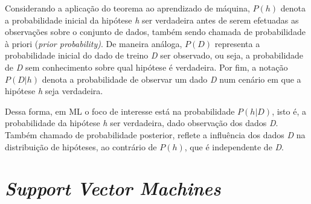 Considerando a aplicação do teorema ao aprendizado de máquina, $P(h)$ denota a probabilidade inicial da hipótese \textit{h} ser verdadeira antes de serem efetuadas as observações sobre o conjunto de dados, também sendo chamada de probabilidade à priori (\textit{prior probability)}. De maneira análoga, $P(D)$ representa a probabilidade inicial do dado de treino \textit{D} ser observado, ou seja, a probabilidade de \textit{D} sem conhecimento sobre qual hipótese é verdadeira. Por fim, a notação $P(D|h)$ denota a probabilidade de observar um dado \textit{D} num cenário em que a hipótese \textit{h} seja verdadeira. \par


Dessa forma, em ML o foco de interesse está na probabilidade $P(h|D)$, isto é, a probabilidade da hipótese \textit{h} ser verdadeira, dado observação dos dados \textit{D}. Também chamado de probabilidade posterior, reflete a influência dos dados \textit{D} na distribuição de hipóteses, ao contrário de $P(h)$, que é independente de \textit{D}.\cite{Mitchell,Shalev-Shwartz:2014:UML:2621980}\par

\section{\textit{Support Vector Machines}}
\label{sec:sec1}
